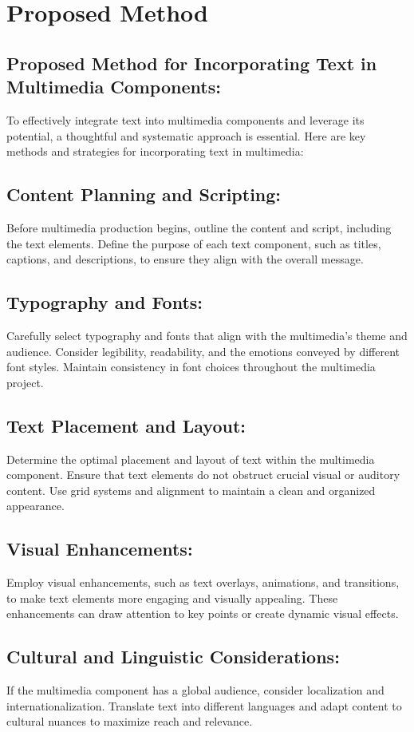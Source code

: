 \documentclass[12pt]{report}
\begin{document}
\section*{Proposed Method}
\subsection*{Proposed Method for Incorporating Text in Multimedia Components:} To effectively integrate text into multimedia components and leverage its potential, a thoughtful and systematic approach is essential. Here are key methods and strategies for incorporating text in multimedia:
\subsection*{Content Planning and Scripting:} Before multimedia production begins, outline the content and script, including the text elements. Define the purpose of each text component, such as titles, captions, and descriptions, to ensure they align with the overall message.
\subsection*{Typography and Fonts:} Carefully select typography and fonts that align with the multimedia's theme and audience. Consider legibility, readability, and the emotions conveyed by different font styles.\cite{fonts} Maintain consistency in font choices throughout the multimedia project.
\subsection*{Text Placement and Layout:} Determine the optimal placement and layout of text within the multimedia component. Ensure that text elements do not obstruct crucial visual or auditory content. Use grid systems and alignment to maintain a clean and organized appearance.
\subsection*{Visual Enhancements:} Employ visual enhancements, such as text overlays, animations, and transitions, to make text elements more engaging and visually appealing. These enhancements can draw attention to key points or create dynamic visual effects.\cite{multimedia}
\subsection*{Cultural and Linguistic Considerations:} If the multimedia component has a global audience, consider localization and internationalization. Translate text into different languages and adapt content to cultural nuances to maximize reach and relevance.
\end{document}
